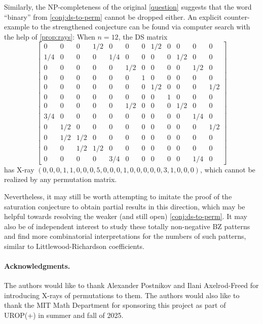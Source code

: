 \documentclass[letterpaper,reqno,11pt]{amsart}
\begin{document}
Similarly, the NP-completeness of the original \cref{question} suggests that the word ``binary'' from \cref{conj:ds-to-perm} cannot be dropped either. An explicit counter-example to the strengthened conjecture can be found via computer search with the help of \cref{prop:rays}: When $n = 12$, the DS matrix
\[
\begin{bmatrix}
    0 & 0 & 0 & 1/2 & 0 & 0 & 0 & 1/2 & 0 & 0 & 0 & 0 \\
    1/4 & 0 & 0 & 0 & 1/4 & 0 & 0 & 0 & 0 & 1/2 & 0 & 0 \\
    0 & 0 & 0 & 0 & 0 & 1/2 & 0 & 0 & 0 & 0 & 1/2 & 0 \\
    0 & 0 & 0 & 0 & 0 & 0 & 1 & 0 & 0 & 0 & 0 & 0 \\
    0 & 0 & 0 & 0 & 0 & 0 & 0 & 1/2 & 0 & 0 & 0 & 1/2 \\
    0 & 0 & 0 & 0 & 0 & 0 & 0 & 0 & 1 & 0 & 0 & 0 \\
    0 & 0 & 0 & 0 & 0 & 1/2 & 0 & 0 & 0 & 1/2 & 0 & 0 \\
    3/4 & 0 & 0 & 0 & 0 & 0 & 0 & 0 & 0 & 0 & 1/4 & 0 \\
    0 & 1/2 & 0 & 0 & 0 & 0 & 0 & 0 & 0 & 0 & 0 & 1/2 \\
    0 & 1/2 & 1/2 & 0 & 0 & 0 & 0 & 0 & 0 & 0 & 0 & 0 \\
    0 & 0 & 1/2 & 1/2 & 0 & 0 & 0 & 0 & 0 & 0 & 0 & 0 \\
    0 & 0 & 0 & 0 & 3/4 & 0 & 0 & 0 & 0 & 0 & 1/4 & 0 
\end{bmatrix}
\]
has X-ray $(0, 0, 0, 1, 1, 0, 0, 0, 5, 0, 0, 0, 1, 0, 0, 0, 0, 0, 3, 1, 0, 0, 0)$, which cannot be realized by any permutation matrix.


Nevertheless, it may still be worth attempting to imitate the proof of the saturation conjecture to obtain partial results in this direction, which may be helpful towards resolving the weaker (and still open) \cref{conj:ds-to-perm}. It may also be of independent interest to study these totally non-negative BZ patterns and find more combinatorial interpretations for the numbers of such patterns, similar to Littlewood-Richardson coefficients.

\bigskip

\paragraph{\bfseries Acknowledgments.} The authors would like to thank Alexander Postnikov and Ilani Axelrod-Freed for introducing X-rays of permutations to them. The authors would also like to thank the MIT Math Department for sponsoring this project as part of UROP(+) in summer and fall of 2025.



\end{document}
